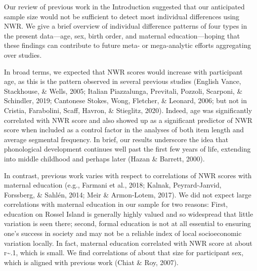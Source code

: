 \documentclass[
  american,
  ,man,floatsintext]{apa6}
\begin{document}
Our review of previous work in the Introduction suggested that our anticipated sample size would not be sufficient to detect most individual differences using NWR. We give a brief overview of individual difference patterns of four types in the present data---age, sex, birth order, and maternal education---hoping that these findings can contribute to future meta- or mega-analytic efforts aggregating over studies.

In broad terms, we expected that NWR scores would increase with participant age, as this is the pattern observed in several previous studies (English Vance, Stackhouse, \& Wells, 2005; Italian Piazzalunga, Previtali, Pozzoli, Scarponi, \& Schindler, 2019; Cantonese Stokes, Wong, Fletcher, \& Leonard, 2006; but not in Cristia, Farabolini, Scaff, Havron, \& Stieglitz, 2020). Indeed, age was significantly correlated with NWR score and also showed up as a significant predictor of NWR score when included as a control factor in the analyses of both item length and average segmental frequency. In brief, our results underscore the idea that phonological development continues well past the first few years of life, extending into middle childhood and perhaps later (Hazan \& Barrett, 2000).

In contrast, previous work varies with respect to correlations of NWR scores with maternal education (e.g., Farmani et al., 2018; Kalnak, Peyrard-Janvid, Forssberg, \& Sahlén, 2014; Meir \& Armon-Lotem, 2017). We did not expect large correlations with maternal education in our sample for two reasons: First, education on Rossel Island is generally highly valued and so widespread that little variation is seen there; second, formal education is not at all essential to ensuring one's success in society and may not be a reliable index of local socioeconomic variation locally. In fact, maternal education correlated with NWR score at about r\textasciitilde.1, which is small. We find correlations of about that size for participant sex, which is aligned with previous work (Chiat \& Roy, 2007).
\end{document}
